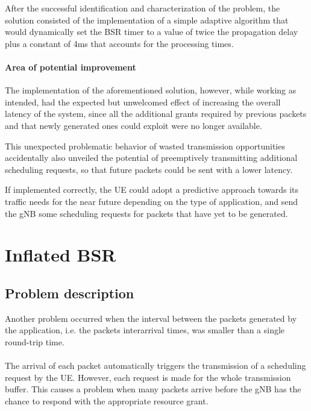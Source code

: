 After the successful identification and characterization of the problem, the  solution consisted of the implementation of a simple adaptive algorithm that would dynamically set the \ac{BSR} timer to a value of twice the propagation delay plus a constant of 4ms that accounts for the processing times.

\paragraph{Area of potential improvement}
The implementation of the aforementioned solution, however, while working as intended, had the expected but unwelcomed effect of increasing the overall latency of the system, since all the additional grants required by previous packets and that newly generated ones could exploit were no longer available.

This unexpected problematic behavior of wasted transmission opportunities accidentally also unveiled the potential of preemptively transmitting additional scheduling requests, so that future packets could be sent with a lower latency.

If implemented correctly, the \ac{UE} could adopt a predictive approach towards its traffic needs for the near future depending on the type of application, and send the \ac{gNB} some scheduling requests for packets that have yet to be generated.

\section{Inflated BSR}

\subsection{Problem description}
Another problem occurred when the interval between the packets generated by the application, i.e. the packets interarrival times, was smaller than a single round-trip time. 

\paragraph{}
The arrival of each packet automatically triggers the transmission of a scheduling request by the \ac{UE}. However, each request is made for the whole transmission buffer. This causes a problem when many packets arrive before the \ac{gNB} has the chance to respond with the appropriate resource grant.

